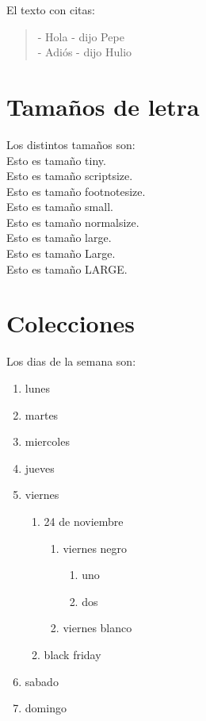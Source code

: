 \documentclass[10pt,a4paper]{article}
\begin{document}
El texto con citas:
\begin{quote}
  - Hola - dijo Pepe \\
  - Adiós - dijo Hulio \\ 
\end{quote}

\section{Tamaños de letra}
Los distintos tamaños son: \\

{\tiny Esto es tamaño tiny.} \\
{\scriptsize Esto es tamaño scriptsize.} \\
{\footnotesize Esto es tamaño footnotesize.} \\
{\small Esto es tamaño small.} \\
{\normalsize Esto es tamaño normalsize.} \\
{\large Esto es tamaño large.} \\
{\Large Esto es tamaño Large.} \\
{\LARGE Esto es tamaño LARGE.} \\

\section{Colecciones}
Los dias de la semana son:
\begin{enumerate}
\item lunes
\item martes
\item miercoles
\item jueves
\item viernes
	\begin{enumerate}
	\item 24 de noviembre
		\begin{enumerate}
		\item viernes negro
			\begin{enumerate}
			\item uno
			\item dos
			\end{enumerate}
		\item viernes blanco
		\end{enumerate}
	\item black friday
	\end{enumerate}
\item sabado
\item domingo
\end{enumerate}
\end{document}
